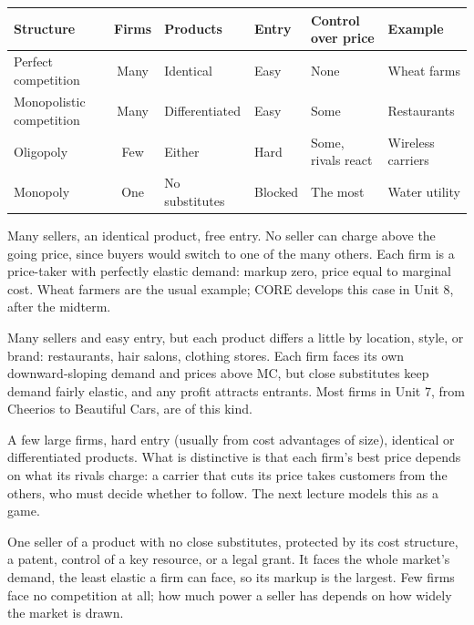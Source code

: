 \documentclass[11pt]{article}
\begin{document}
\begin{keypanel}
\small\renewcommand{\arraystretch}{1.25}\setlength{\tabcolsep}{5pt}
\begin{tabular}{@{}l c l l l l@{}}
\toprule
\textbf{Structure} & \textbf{Firms} & \textbf{Products} & \textbf{Entry} & \textbf{Control over price} & \textbf{Example} \\
\midrule
Perfect competition      & Many & Identical       & Easy    & None               & Wheat farms \\
Monopolistic competition & Many & Differentiated  & Easy    & Some               & Restaurants \\
Oligopoly                & Few  & Either          & Hard    & Some, rivals react & Wireless carriers \\
Monopoly                 & One  & No substitutes  & Blocked & The most           & Water utility \\
\bottomrule
\end{tabular}
\end{keypanel}

 Many sellers, an identical product, free entry. No seller can charge above the going price, since buyers would switch to one of the many others. Each firm is a price-taker with perfectly elastic demand: markup zero, price equal to marginal cost. Wheat farmers are the usual example; CORE develops this case in Unit 8, after the midterm.

 Many sellers and easy entry, but each product differs a little by location, style, or brand: restaurants, hair salons, clothing stores. Each firm faces its own downward-sloping demand and prices above MC, but close substitutes keep demand fairly elastic, and any profit attracts entrants. Most firms in Unit 7, from Cheerios to Beautiful Cars, are of this kind.

 A few large firms, hard entry (usually from cost advantages of size), identical or differentiated products. What is distinctive is that each firm's best price depends on what its rivals charge: a carrier that cuts its price takes customers from the others, who must decide whether to follow. The next lecture models this as a game.

 One seller of a product with no close substitutes, protected by its cost structure, a patent, control of a key resource, or a legal grant. It faces the whole market's demand, the least elastic a firm can face, so its markup is the largest. Few firms face no competition at all; how much power a seller has depends on how widely the market is drawn.
\end{document}
